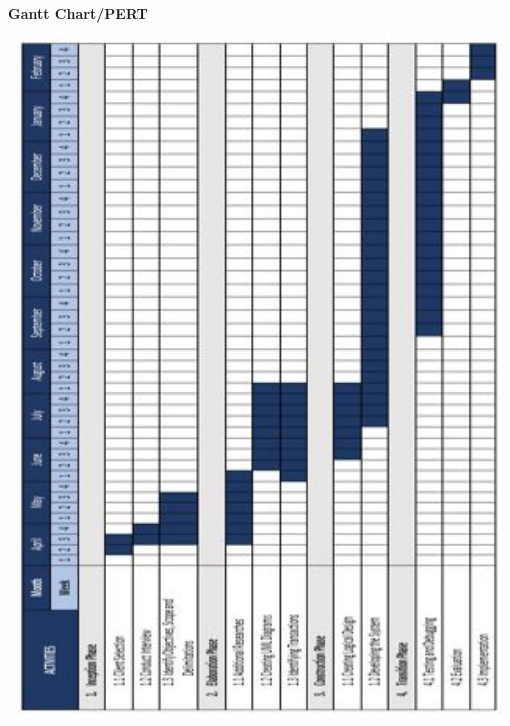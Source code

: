 \begin{center} 
    \textbf{}
\end{center}

    \begin{center}
    \textbf{Gantt Chart/PERT}
    \end{center}
    
\begin{center}
 \includegraphics[width=15cm, height=18cm]{image/c1.jpg}
\end{center}

